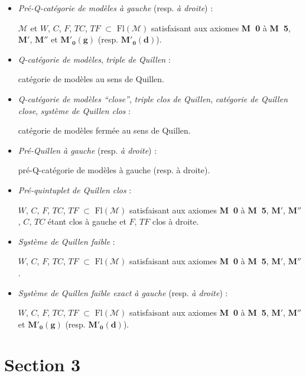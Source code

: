 \documentclass[11pt]{article}
\newcommand{\Fl}{\mathrm{Fl}}
\newcommand{\Mo}{\mathcal{M}}
\newcommand{\Mzg}{$\mathbf{M}'_{\mathbf{0}}\mathbf{(g)}$}
\newcommand{\Mzd}{$\mathbf{M}'_{\mathbf{0}}\mathbf{(d)}$}
\begin{document}
\begin{itemize}
\item[\textbullet] \textit{Pré-Q-catégorie de modèles à gauche} (resp. \textit{à droite}) :

$\Mo$ et $W$, $C$, $F$, $TC$, $TF$ $\subset$ $\Fl(\Mo)$ satisfaisant aux axiomes \textbf{M~0} à \textbf{M~5}, $\mathbf{M}'$, $\mathbf{M}''$ et \Mzg{} (resp. \Mzd).

\item[\textbullet] \textit{Q-catégorie de modèles}, \textit{triple de Quillen} :

catégorie de modèles au sens de Quillen.

\item[\textbullet] \textit{Q-catégorie de modèles “close”}, \textit{triple clos de Quillen}, \textit{catégorie de Quillen close}, \textit{système de Quillen clos} :

catégorie de modèles fermée au sens de Quillen.

\item[\textbullet] \textit{Pré-Quillen à gauche} (resp. \textit{à droite}) :

pré-Q-catégorie de modèles à gauche (resp. à droite).

\item[\textbullet] \textit{Pré-quintuplet de Quillen clos} :

$W$, $C$, $F$, $TC$, $TF$ $\subset$ $\Fl(\Mo)$ satisfaisant aux axiomes \textbf{M~0} à \textbf{M~5}, $\mathbf{M}'$, $\mathbf{M}''$, $C$, $TC$ étant clos à gauche et $F$, $TF$ clos à droite.

\item[\textbullet] \textit{Système de Quillen faible} :

$W$, $C$, $F$, $TC$, $TF$ $\subset$ $\Fl(\Mo)$ satisfaisant aux axiomes \textbf{M~0} à \textbf{M~5}, $\mathbf{M}'$, $\mathbf{M}''$.

\item[\textbullet] \textit{Système de Quillen faible exact à gauche} (resp. \textit{à droite}) :

$W$, $C$, $F$, $TC$, $TF$ $\subset$ $\Fl(\Mo)$ satisfaisant aux axiomes \textbf{M~0} à \textbf{M~5}, $\mathbf{M}'$, $\mathbf{M}''$ et \Mzg{} (resp. \Mzd).
\end{itemize}

\section*{Section 3}
\end{document}
